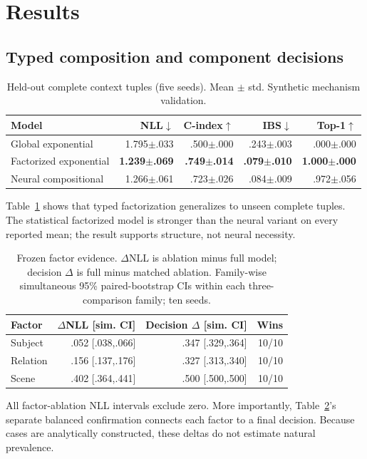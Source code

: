 \documentclass{article}
\begin{document}
\section{Results}
\subsection{Typed composition and component decisions}
\begin{table}[t]
\centering
\caption{Held-out complete context tuples (five seeds). Mean $\pm$ std. Synthetic mechanism validation.}
\label{tab:composition}
\small
\begin{tabular}{lrrrr}
\toprule
Model & NLL$\downarrow$ & C-index$\uparrow$ & IBS$\downarrow$ & Top-1$\uparrow$\\
\midrule
Global exponential & 1.795$\pm$.033 & .500$\pm$.000 & .243$\pm$.003 & .000$\pm$.000\\
Factorized exponential & \textbf{1.239$\pm$.069} & \textbf{.749$\pm$.014} & \textbf{.079$\pm$.010} & \textbf{1.000$\pm$.000}\\
Neural compositional & 1.266$\pm$.061 & .723$\pm$.026 & .084$\pm$.009 & .972$\pm$.056\\
\bottomrule
\end{tabular}
\end{table}

Table~\ref{tab:composition} shows that typed factorization generalizes to unseen complete tuples. The statistical factorized model is stronger than the neural variant on every reported mean; the result supports structure, not neural necessity.

\begin{table}[t]
\centering
\caption{Frozen factor evidence. $\Delta$NLL is ablation minus full model; decision $\Delta$ is full minus matched ablation. Family-wise simultaneous 95\% paired-bootstrap CIs within each three-comparison family; ten seeds.}
\label{tab:components}
\small
\begin{tabular}{lrrr}
\toprule
Factor & $\Delta$NLL [sim. CI] & Decision $\Delta$ [sim. CI] & Wins\\
\midrule
Subject & .052 [.038,.066] & .347 [.329,.364] & 10/10\\
Relation & .156 [.137,.176] & .327 [.313,.340] & 10/10\\
Scene & .402 [.364,.441] & .500 [.500,.500] & 10/10\\
\bottomrule
\end{tabular}
\end{table}
All factor-ablation NLL intervals exclude zero. More importantly, Table~\ref{tab:components}'s separate balanced confirmation connects each factor to a final decision. Because cases are analytically constructed, these deltas do not estimate natural prevalence.
\end{document}
